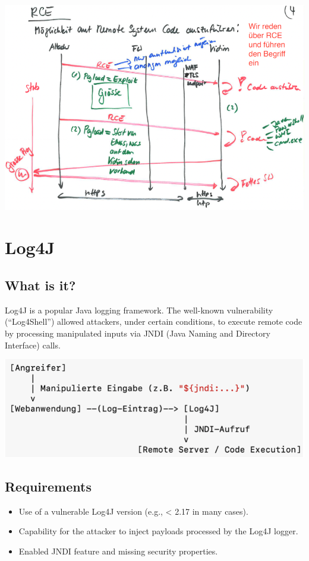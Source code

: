 \begin{center}
    \includegraphics[scale=1]{resources/01_rce.png}
\end{center}

\section*{Log4J}
\subsection*{What is it?}
Log4J is a popular Java logging framework. The well-known vulnerability (“Log4Shell”) allowed attackers, under certain conditions, to execute remote code by processing manipulated inputs via JNDI (Java Naming and Directory Interface) calls.

\begin{center}
    \includegraphics[scale=1]{resources/01_log4j.png}
\end{center}

\subsection*{Requirements}
\begin{itemize}
    \item Use of a vulnerable Log4J version (e.g., < 2.17 in many cases).
    \item Capability for the attacker to inject payloads processed by the Log4J logger.
    \item Enabled JNDI feature and missing security properties.
\end{itemize}


